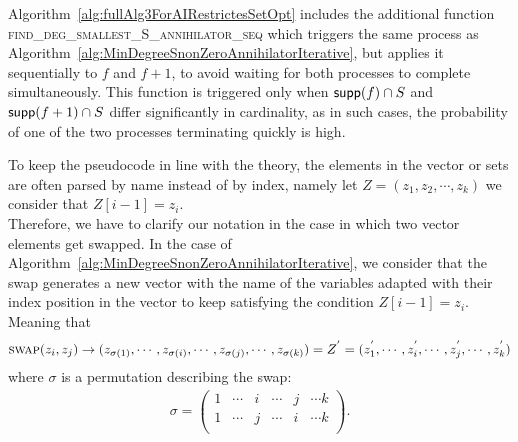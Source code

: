 \documentclass[11pt]{llncs}
\begin{document}
Algorithm~\ref{alg:fullAlg3ForAIRestrictesSetOpt} includes the additional function \textsc{find\_deg\_smallest\_S\_annihilator\_seq} which triggers the same process as Algorithm~\ref{alg:MinDegreeSnonZeroAnnihilatorIterative}, but applies it sequentially to $f$ and $f + 1$, to avoid waiting for both processes to complete simultaneously. This function is triggered only when $\mathsf{supp}(f) \cap S$ and $\mathsf{supp}(f + 1) \cap S$ differ significantly in cardinality, as in such cases, the probability of one of the two processes terminating quickly is high.

\begin{remark}\label{rem:permutationClarification}
    To keep the pseudocode in line with the theory, the elements in the vector or sets are often parsed by name instead of by index, namely let $Z = (z_1, z_2, \cdots, z_k)$ we consider that $Z[i-1] = z_i$.\\
    Therefore, we have to clarify our notation in the case in which two vector elements get swapped. In the case of Algorithm~\ref{alg:MinDegreeSnonZeroAnnihilatorIterative}, we consider that the swap generates a new vector with the name of the variables adapted with their index position in the vector to keep satisfying the condition $Z[i-1] = z_{i}$. Meaning that 
    \begin{align*}
        \mbox{\textsc{swap}}(z_i, z_j) \rightarrow (z_{\sigma(1)}, \cdots, z_{\sigma(i)}, \cdots, z_{\sigma(j)}, \cdots, z_{\sigma(k)}) = Z^{'} = (z^{'}_1, \cdots, z^{'}_i, \cdots, z^{'}_j, \cdots, z^{'}_k)
    \end{align*}
    where $\sigma$ is a permutation describing the swap:
    \begin{align*}
        \sigma = \begin{pmatrix}
            1 & \cdots & i & \cdots & j & \cdots k\\
            1 & \cdots & j & \cdots & i & \cdots k\\
        \end{pmatrix}.
    \end{align*}
\end{remark}

\setcounter{algorithm}{1} 
\end{document}
